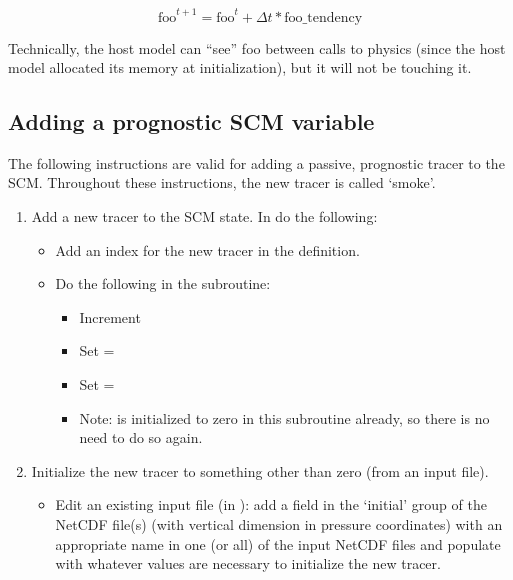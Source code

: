 \begin{equation}
\text{foo}^{t+1} = \text{foo}^t + \Delta t*\text{foo\_tendency}
\end{equation}

Technically, the host model can ``see'' foo between calls to physics (since the host model allocated its memory at initialization), but it will not be touching it.

\subsection{Adding a prognostic SCM variable}

The following instructions are valid for adding a passive, prognostic tracer to the SCM. Throughout these instructions, the new tracer is called `smoke'.

\begin{enumerate}
\item Add a new tracer to the SCM state. In  do the following:
	\begin{itemize}
	\item Add an index for the new tracer in the  definition.
	\item Do the following in the  subroutine:
		\begin{itemize}
		\item Increment 
		\item Set  = 
		\item Set  = 
		\item Note:  is initialized to zero in this subroutine already, so there is no need to do so again.
		\end{itemize}
	\end{itemize}
\item Initialize the new tracer to something other than zero (from an input file).
	\begin{itemize}
	\item Edit an existing input file (in ): add a field in the `initial' group of the NetCDF file(s) (with vertical dimension in pressure coordinates) with an appropriate name in one (or all) of the input NetCDF files and populate with whatever values are necessary to initialize the new tracer.

\end{itemize}
\end{enumerate}
